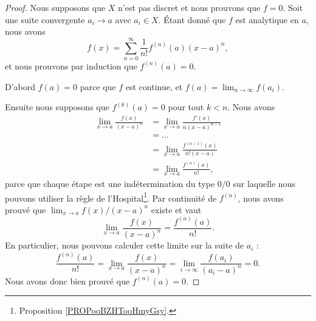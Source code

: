 \begin{proof}
	Nous supposons que \( X\) n'est pas discret et nous prouvons que \( f=0\). Soit une suite convergente \( a_i\to a\) avec \( a_i\in X\). Étant donné que \( f\) est analytique en \( a\), nous avons
	\begin{equation}
		f(x)=\sum_{n=0}^{\infty}\frac{1}{ n!}f^{(n)}(a)(x-a)^n,
	\end{equation}
	et nous prouvons par induction que \( f^{(n)}(a)=0\).

	D'abord \( f(a)=0\) parce que \( f\) est continue, et \( f(a)=\lim_{n\to\infty}f(a_i)\).

	Ensuite nous supposons que \( f^{(k)}(a)=0\) pour tout \( k<n\). Nous avons
	\begin{subequations}
		\begin{align}
			\lim_{x\to a}\frac{ f(x) }{ (x-a)^n } & = \lim_{x\to a}\frac{ f'(x) }{ n(x-a)^{n-1} }   \\
			                                      & = \ldots                                        \\
			                                      & = \lim_{x\to a}\frac{ f^{(n-1)}(x) }{ n!(x-a) } \\
			                                      & = \lim_{x\to a}\frac{ f^{(n)}(x) }{ n! },
		\end{align}
	\end{subequations}
	parce que chaque étape est une indétermination du type \( 0/0\) sur laquelle nous pouvons utiliser la règle de l'Hospital\footnote{Proposition \ref{PROPooBZHTooHmyGsy}.}. Par continuité de \( f^{(n)}\), nous avons prouvé que \( \lim_{x\to a}f(x)/(x-a)^n\) existe et vaut
	\begin{equation}
		\lim_{x\to a}\frac{ f(x) }{ (x-a)^n }=\frac{ f^{(n)}(a) }{ n! }.
	\end{equation}
	En particulier, nous pouvons calculer cette limite sur la suite de \( a_i\) :
	\begin{equation}
		\frac{ f^{(n)}(a) }{ n! }=\lim_{x\to a}\frac{ f(x) }{ (x-a)^n }=\lim_{i\to \infty}\frac{ f(a_i) }{ (a_i-a)^n }=0.
	\end{equation}
	Nous avons donc bien prouvé que \( f^{(n)}(a)=0\).
\end{proof}
